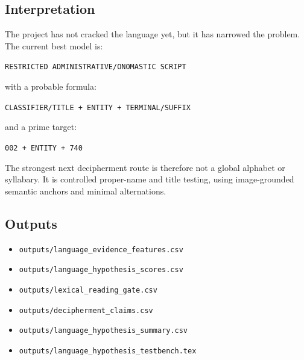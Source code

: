 \subsection{Interpretation}

The project has not cracked the language yet, but it has narrowed the problem. The current best model is:

\begin{center}
\texttt{RESTRICTED ADMINISTRATIVE/ONOMASTIC SCRIPT}
\end{center}

with a probable formula:

\begin{center}
\texttt{CLASSIFIER/TITLE + ENTITY + TERMINAL/SUFFIX}
\end{center}

and a prime target:

\begin{center}
\texttt{002 + ENTITY + 740}
\end{center}

The strongest next decipherment route is therefore not a global alphabet or syllabary. It is controlled proper-name and title testing, using image-grounded semantic anchors and minimal alternations.

\subsection{Outputs}

\begin{itemize}
  \item \texttt{outputs/language\_evidence\_features.csv}
  \item \texttt{outputs/language\_hypothesis\_scores.csv}
  \item \texttt{outputs/lexical\_reading\_gate.csv}
  \item \texttt{outputs/decipherment\_claims.csv}
  \item \texttt{outputs/language\_hypothesis\_summary.csv}
  \item \texttt{outputs/language\_hypothesis\_testbench.tex}
\end{itemize}
